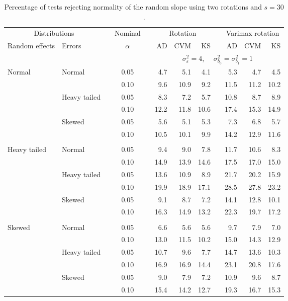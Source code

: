 \begin{table}[ht]
\centering
\caption{\label{tab:fixedsimb130} Percentage of tests rejecting normality of the random slope using two rotations and $s = 30$.}
\begin{scriptsize}
\begin{tabular}{ll p{.1cm} c p{.1cm} rrr p{.1cm} rrr}
  \hline
  \multicolumn{2}{c}{Distributions}& & Nominal & &  \multicolumn{3}{c}{Rotation} & & \multicolumn{3}{c}{Varimax rotation} \\ \cline{1-2} \cline{6-8} \cline{10-12}   
  Random effects & Errors & & $\alpha$ & & AD & CVM & KS & & AD & CVM & KS \\ 
   \hline
& && && \multicolumn{7}{c}{$\sigma_{\varepsilon}^2 = 4$, \ \ $\sigma_{b_0}^2 = \sigma_{b_1}^2 = 1$} \\ \cline{6-12}
\rowcolor{gray!20} Normal & Normal &  & 0.05 &  & 4.7 & 5.1 & 4.1 &  & 5.3 & 4.7 & 4.5 \\ 
\rowcolor{gray!20}    &  &  & 0.10 &  & 9.6 & 10.9 & 9.2 &  & 11.5 & 11.2 & 10.2 \\ 
\rowcolor{gray!20}    & Heavy tailed &  & 0.05 &  & 8.3 & 7.2 & 5.7 &  & 10.8 & 8.7 & 8.9 \\ 
\rowcolor{gray!20}    &  &  & 0.10 &  & 12.2 & 11.8 & 10.6 &  & 17.4 & 15.3 & 14.9 \\ 
\rowcolor{gray!20}    & Skewed &  & 0.05 &  & 5.6 & 5.1 & 5.3 &  & 7.3 & 6.8 & 5.7 \\ 
\rowcolor{gray!20}    &  &  & 0.10 &  & 10.5 & 10.1 & 9.9 &  & 14.2 & 12.9 & 11.6 \\ 
&&&&&&&&&&&\\
  Heavy tailed & Normal &  & 0.05 &  & 9.4 & 9.0 & 7.8 &  & 11.7 & 10.6 & 8.3 \\ 
   &  &  & 0.10 &  & 14.9 & 13.9 & 14.6 &  & 17.5 & 17.0 & 15.0 \\ 
   & Heavy tailed &  & 0.05 &  & 13.6 & 10.9 & 8.9 &  & 21.7 & 20.2 & 15.9 \\ 
   &  &  & 0.10 &  & 19.9 & 18.9 & 17.1 &  & 28.5 & 27.8 & 23.2 \\ 
   & Skewed &  & 0.05 &  & 9.1 & 8.7 & 7.2 &  & 14.1 & 12.8 & 10.1 \\ 
   &  &  & 0.10 &  & 16.3 & 14.9 & 13.2 &  & 22.3 & 19.7 & 17.2 \\ 
&&&&&&&&&&&\\
  Skewed & Normal &  & 0.05 &  & 6.6 & 5.6 & 5.6 &  & 9.7 & 7.9 & 7.0 \\ 
   &  &  & 0.10 &  & 13.0 & 11.5 & 10.2 &  & 15.0 & 14.3 & 12.9 \\ 
   & Heavy tailed &  & 0.05 &  & 10.7 & 9.6 & 7.7 &  & 14.7 & 13.6 & 10.3 \\ 
   &  &  & 0.10 &  & 16.9 & 16.9 & 14.4 &  & 23.1 & 20.8 & 17.6 \\ 
   & Skewed &  & 0.05 &  & 9.0 & 7.9 & 7.2 &  & 10.9 & 9.6 & 8.7 \\ 
   &  &  & 0.10 &  & 15.4 & 14.2 & 12.7 &  & 19.3 & 16.7 & 15.3 \\ 


\end{tabular}
\end{scriptsize}
\end{table}
